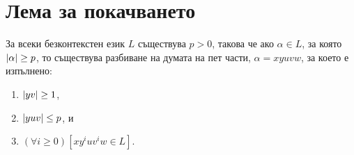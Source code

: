 \section{Лема за покачването}

\begin{lemma}
  \label{lem:pumping-context} 
  За всеки безконтекстен език $L$ съществува $p>0$, такова
  че ако $\alpha\in L$, за която $\vert{\alpha}\vert \geq p$, то съществува разбиване на думата на пет части, $\alpha=xyuvw$,
  за което е изпълнено:
  \begin{enumerate}[1)]
  \item
    $\vert{yv}\vert\geq 1$,
  \item
    $\vert{yuv}\vert\leq p$, и
  \item
    $(\forall i\geq 0)[xy^iuv^iw\in L]$.
\end{enumerate}
\end{lemma}
